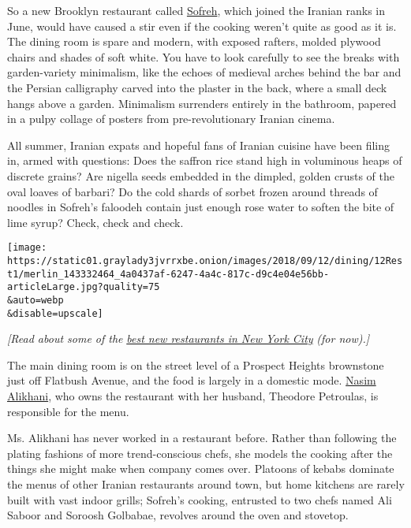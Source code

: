So a new Brooklyn restaurant called
\href{http://www.sofrehnyc.com/}{Sofreh}, which joined the Iranian ranks
in June, would have caused a stir even if the cooking weren't quite as
good as it is. The dining room is spare and modern, with exposed
rafters, molded plywood chairs and shades of soft white. You have to
look carefully to see the breaks with garden-variety minimalism, like
the echoes of medieval arches behind the bar and the Persian calligraphy
carved into the plaster in the back, where a small deck hangs above a
garden. Minimalism surrenders entirely in the bathroom, papered in a
pulpy collage of posters from pre-revolutionary Iranian cinema.

All summer, Iranian expats and hopeful fans of Iranian cuisine have been
filing in, armed with questions: Does the saffron rice stand high in
voluminous heaps of discrete grains? Are nigella seeds embedded in the
dimpled, golden crusts of the oval loaves of barbari? Do the cold shards
of sorbet frozen around threads of noodles in Sofreh's faloodeh contain
just enough rose water to soften the bite of lime syrup? Check, check
and check.

\texttt{[image: https://static01.graylady3jvrrxbe.onion/images/2018/09/12/dining/12Rest1/merlin\_143332464\_4a0437af-6247-4a4c-817c-d9c4e04e56bb-articleLarge.jpg?quality=75\\\&auto=webp\\\&disable=upscale]}

\emph{{[}Read about some of the}
\href{https://www.nytimes3xbfgragh.onion/2018/11/15/nyregion/best-new-nyc-restaurants.html?action=click\&module=Intentional\&pgtype=Article}{\emph{best
new restaurants in New York City}} \emph{(for now).{]}}

The main dining room is on the street level of a Prospect Heights
brownstone just off Flatbush Avenue, and the food is largely in a
domestic mode.
\href{https://www.nytimes3xbfgragh.onion/2018/08/20/dining/sofreh-persian-restaurant-new-york-city.html}{Nasim
Alikhani}, who owns the restaurant with her husband, Theodore Petroulas,
is responsible for the menu.

Ms. Alikhani has never worked in a restaurant before. Rather than
following the plating fashions of more trend-conscious chefs, she models
the cooking after the things she might make when company comes over.
Platoons of kebabs dominate the menus of other Iranian restaurants
around town, but home kitchens are rarely built with vast indoor grills;
Sofreh's cooking, entrusted to two chefs named Ali Saboor and Soroosh
Golbabae, revolves around the oven and stovetop.


